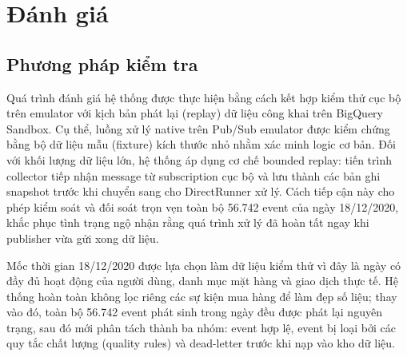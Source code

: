 \section{Đánh giá}
\label{sec:evaluation}

\subsection{Phương pháp kiểm tra}

Quá trình đánh giá hệ thống được thực hiện bằng cách kết hợp kiểm thử cục bộ trên emulator với kịch bản phát lại (replay) dữ liệu công khai trên BigQuery Sandbox. Cụ thể, luồng xử lý native trên Pub/Sub emulator được kiểm chứng bằng bộ dữ liệu mẫu (fixture) kích thước nhỏ nhằm xác minh logic cơ bản. Đối với khối lượng dữ liệu lớn, hệ thống áp dụng cơ chế bounded replay: tiến trình collector tiếp nhận message từ subscription cục bộ và lưu thành các bản ghi snapshot trước khi chuyển sang cho DirectRunner xử lý. Cách tiếp cận này cho phép kiểm soát và đối soát trọn vẹn toàn bộ 56.742 event của ngày 18/12/2020, khắc phục tình trạng ngộ nhận rằng quá trình xử lý đã hoàn tất ngay khi publisher vừa gửi xong dữ liệu. \medskip

Mốc thời gian 18/12/2020 được lựa chọn làm dữ liệu kiểm thử vì đây là ngày có đầy đủ hoạt động của người dùng, danh mục mặt hàng và giao dịch thực tế. Hệ thống hoàn toàn không lọc riêng các sự kiện mua hàng để làm đẹp số liệu; thay vào đó, toàn bộ 56.742 event phát sinh trong ngày đều được phát lại nguyên trạng, sau đó mới phân tách thành ba nhóm: event hợp lệ, event bị loại bởi các quy tắc chất lượng (quality rules) và dead-letter trước khi nạp vào kho dữ liệu.

